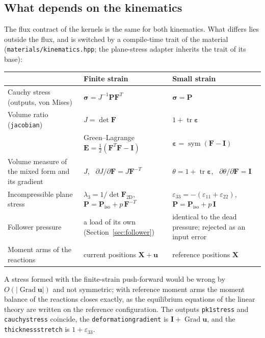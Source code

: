\documentclass[11pt]{article}
\newcommand{\Grad}{\operatorname{Grad}}
\newcommand{\sym}{\operatorname{sym}}
\newcommand{\tr}{\operatorname{tr}}
\newcommand{\bX}{\bm{X}}
\newcommand{\bu}{\bm{u}}
\newcommand{\bsig}{\bm{\sigma}}
\newcommand{\beps}{\bm{\varepsilon}}
\newcommand{\bP}{\bm{P}}
\newcommand{\bF}{\bm{F}}
\newcommand{\bE}{\bm{E}}
\newcommand{\bI}{\bm{I}}
\DeclareRobustCommand{\code}[1]{{\def\_{\textunderscore\allowbreak}\texttt{#1}}}
\DeclareRobustCommand{\file}[1]{{\def\_{\textunderscore\allowbreak}\texttt{#1}}}
\begin{document}
\subsection{What depends on the kinematics}

The flux contract of the kernels is the same for both kinematics.  What
differs lies outside the flux, and is switched by a compile-time trait of
the material (\file{materials/kinematics.hpp}; the plane-stress adapter
inherits the trait of its base):
\begin{center}
\small
\renewcommand{\arraystretch}{1.15}
\begin{tabular}{@{}>{\raggedright\arraybackslash}p{4.4cm} >{\raggedright\arraybackslash}p{4.9cm} >{\raggedright\arraybackslash}p{5.6cm}@{}}
\toprule
 & Finite strain & Small strain \\
\midrule
Cauchy stress (outputs, von Mises) & $\bsig = J^{-1}\bP\bF^T$ & $\bsig = \bP$ \\
Volume ratio (\code{jacobian}) & $J = \det\bF$ & $1 + \tr\beps$ \\
\code{strain} & Green--Lagrange $\bE = \tfrac12(\bF^T\bF - \bI)$ & $\beps = \sym(\bF - \bI)$ \\
Volume measure of the mixed form and its gradient & $J$, \ $\partial J/\partial\bF = J\bF^{-T}$ & $\theta = 1 + \tr\beps$, \ $\partial\theta/\partial\bF = \bI$ \\
Incompressible plane stress & $\lambda_3 = 1/\det\bF_{2\mathrm D}$, $\bP = \bP_{\mathrm{iso}} + p\,\bF^{-T}$ & $\varepsilon_{33} = -(\varepsilon_{11} + \varepsilon_{22})$, $\bP = \bP_{\mathrm{iso}} + p\,\bI$ \\
Follower pressure & a load of its own (Section~\ref{sec:follower}) & identical to the dead pressure; rejected as an input error \\
Moment arms of the reactions & current positions $\bX + \bu$ & reference positions $\bX$ \\
\bottomrule
\end{tabular}
\end{center}
A stress formed with the finite-strain push-forward would be wrong by
$O(|\Grad\bu|)$ and not symmetric; with reference moment arms the moment
balance of the reactions closes exactly, as the equilibrium equations of the
linear theory are written on the reference configuration.  The outputs
\code{pk1\_stress} and \code{cauchy\_stress} coincide, the
\code{deformation\_gradient} is $\bI + \Grad\bu$, and the
\code{thickness\_stretch} is $1 + \varepsilon_{33}$.
\end{document}
